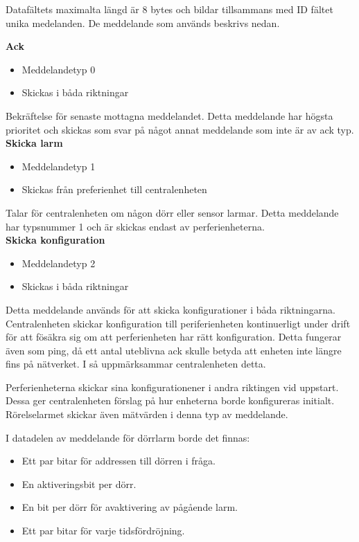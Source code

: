 Datafältets maximalta längd är 8 bytes och bildar tillsammans med ID fältet unika medelanden. De meddelande som används beskrivs nedan.



\textbf{Ack}
\begin{itemize}
    \item Meddelandetyp 0
    \item Skickas i båda riktningar
\end{itemize}
Bekräftelse för senaste mottagna meddelandet. Detta meddelande har högsta prioritet och skickas som svar på något annat meddelande som inte är av ack typ. \\


\textbf{Skicka larm}
\begin{itemize}
    \item Meddelandetyp 1
    \item Skickas från preferienhet till centralenheten
\end{itemize}
Talar för centralenheten om någon dörr eller sensor larmar. Detta meddelande har typsnummer 1 och är skickas endast av perferienheterna. \\


\textbf{Skicka konfiguration}
\begin{itemize}
    \item Meddelandetyp 2
    \item Skickas i båda riktningar
\end{itemize}
Detta meddelande används för att skicka konfigurationer i båda riktningarna. Centralenheten skickar konfiguration till periferienheten kontinuerligt under drift för att fösäkra sig om att perferienheten har rätt konfiguration. Detta fungerar även som ping, då ett antal uteblivna ack skulle betyda att enheten inte längre fins på nätverket. I så uppmärksammar centralenheten detta.

Perferienheterna skickar sina konfigurationener i andra riktingen vid uppstart. Dessa ger centralenheten förslag på hur enheterna borde konfigureras initialt. Rörelselarmet skickar även mätvärden i denna typ av meddelande.

I datadelen av meddelande för dörrlarm borde det finnas:
\begin{itemize}
	\item Ett par bitar för addressen till dörren i fråga.
	\item En aktiveringsbit per dörr.
	\item En bit per dörr för avaktivering av pågående larm.
	\item Ett par bitar för varje tidsfördröjning.
\end{itemize}

